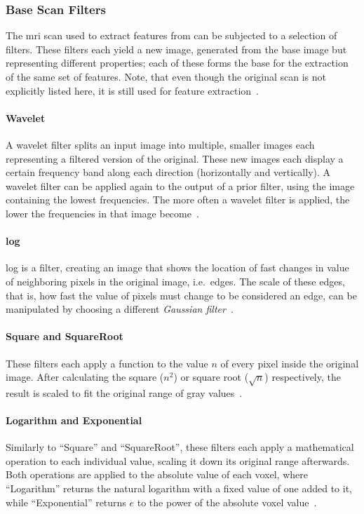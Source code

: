 \subsubsection{Base Scan Filters}\label{sec:base_scan_filters}

The \ac{mri} scan used to extract features from can be subjected to a selection
of filters. These filters each yield a new image, generated from the base image
but representing different properties; each of these forms the base for the 
extraction of the same set of features. Note, that even though the original scan
is not explicitly listed here, it is still used for feature 
extraction~\cite{py_rad_docs}.

\paragraph{Wavelet} A wavelet filter splits an input image into multiple, 
smaller images each representing a filtered version of the original. These new
images each display a certain frequency band along each direction 
(horizontally and vertically). A wavelet filter can be applied again to the 
output of a prior filter, using the image containing the lowest frequencies. 
The more often a wavelet filter is applied, the lower the frequencies in that 
image become~\cite{image_processing_ch6,wavelets_for_kids}.

\paragraph{\acl{log}} \ac{log} is a filter, creating an image that shows the
location of fast changes in value of neighboring pixels in the original image,
i.e.~edges. The scale of these edges, that is, how fast the value of pixels must
change to be considered an edge, can be manipulated by choosing a different 
\textit{Gaussian filter}~\cite{theory_of_edge_detection,py_rad_docs}.

\paragraph{Square and SquareRoot} These filters each apply a function to the 
value $n$ of every pixel inside the original image. After calculating the
square ($n^2$) or square root ($\sqrt{n}$) respectively, the result is scaled 
to fit the original range of gray values~\cite{py_rad_docs}.

\paragraph{Logarithm and Exponential} Similarly to \enquote{Square} and 
\enquote{SquareRoot}, these filters each apply a mathematical operation to each
individual value, scaling it down its original range afterwards. Both operations
are applied to the absolute value of each voxel, where \enquote{Logarithm} 
returns the natural logarithm with a fixed value of one added to it, while
\enquote{Exponential} returns $e$ to the power of the absolute voxel value~\cite{py_rad_docs}.

